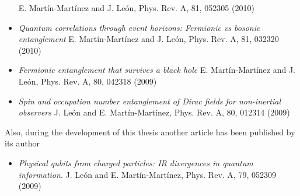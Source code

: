 \begin{itemize}
    E. Mart\'in-Mart\'inez and J. Le\'on, Phys. Rev. A, 81, 052305 (2010)
\vspace{0.3cm}
\item   \emph{Quantum correlations through event horizons: Fermionic vs bosonic entanglement}
    E. Mart\'in-Mart\'inez and J. Le\'on, Phys. Rev. A, 81, 032320 (2010)
\vspace{0.3cm}
\item   \emph{Fermionic entanglement that survives a black hole}
    E. Mart\'in-Mart\'inez and J. Le\'on, Phys. Rev. A, 80, 042318 (2009)
\vspace{0.3cm}
\item   \emph{Spin and occupation number entanglement of Dirac fields for non-inertial observers}
    J. Le\'on and E. Mart\'in-Mart\'inez, Phys. Rev. A, 80, 012314 (2009)
\end{itemize}

Also, during the development of this thesis another article  has been published by its author

\begin{itemize}
\item   \emph{Physical qubits from charged particles: IR divergences in quantum information}.
    J. Le\'on and E. Mart\'in-Mart\'inez, Phys. Rev. A, 79, 052309 (2009)
\end{itemize}



\cleardoublepage
